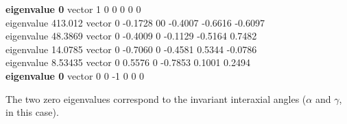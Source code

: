 \documentclass[preprint]{iucr}              %
\numberwithin{equation}{section}
\begin{document}
\begin{itemize}
\textbf{eigenvalue     0}         vector         1 0 0 0 0 0\\
eigenvalue 413.012       vector         0 -0.1728 00 -0.4007 -0.6616 -0.6097\\
eigenvalue 48.3869       vector         0 -0.4009 0 -0.1129 -0.5164 0.7482\\
eigenvalue 14.0785       vector         0 -0.7060 0 -0.4581 0.5344 -0.0786\\
eigenvalue 8.53435       vector         0 0.5576 0 -0.7853 0.1001 0.2494\\
\textbf{eigenvalue     0}         vector         0 0 -1 0 0 0

The two zero eigenvalues correspond to the invariant
interaxial angles ($\alpha$ and $\gamma$, in this case).


\end{itemize}

\vspace{2pt}
\end{document}
